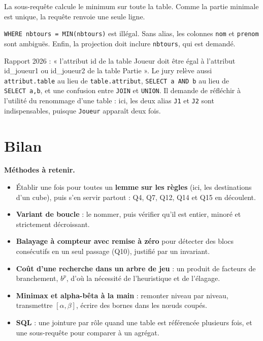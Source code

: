 \documentclass[11pt,a4paper]{article}
\providecommand{\tightlist}{\setlength{\itemsep}{0pt}\setlength{\parskip}{0pt}}
\begin{document}
La sous-requête calcule le minimum sur toute la table. Comme la partie minimale est unique, la requête renvoie une seule ligne.

\begin{piege}

\texttt{WHERE\ nbtours\ =\allowbreak{}\ MIN(\allowbreak{}nbtours)\allowbreak{}} est illégal. Sans alias, les colonnes \texttt{nom} et \texttt{prenom} sont ambiguës. Enfin, la projection doit inclure \texttt{nbtours}, qui est demandé.

\end{piege}

\begin{jury}

Rapport 2026 : « l'attribut id de la table Joueur doit être égal à l'attribut id\_joueur1 ou id\_joueur2 de la table Partie ». Le jury relève aussi \texttt{attribut.table} au lieu de \texttt{table.attribut}, \texttt{SELECT\ a\ AND\ b} au lieu de \texttt{SELECT\ a,b}, et une confusion entre \texttt{JOIN} et \texttt{UNION}. Il demande de réfléchir à l'utilité du renommage d'une table : ici, les deux alias \texttt{J1} et \texttt{J2} sont indispensables, puisque \texttt{Joueur} apparaît deux fois.

\end{jury}

\hypertarget{bilan}{%
\section{Bilan}\label{bilan}}

\textbf{Méthodes à retenir.}

\begin{itemize}
\tightlist
\item
  Établir une fois pour toutes un \textbf{lemme sur les règles} (ici, les destinations d'un cube), puis s'en servir partout : Q4, Q7, Q12, Q14 et Q15 en découlent.
\item
  \textbf{Variant de boucle} : le nommer, puis vérifier qu'il est entier, minoré et strictement décroissant.
\item
  \textbf{Balayage à compteur avec remise à zéro} pour détecter des blocs consécutifs en un seul passage (Q10), justifié par un invariant.
\item
  \textbf{Coût d'une recherche dans un arbre de jeu} : un produit de facteurs de branchement, \(b^p\), d'où la nécessité de l'heuristique et de l'élagage.
\item
  \textbf{Minimax et alpha-bêta à la main} : remonter niveau par niveau, transmettre \([\alpha,\beta]\), écrire des bornes dans les nœuds coupés.
\item
  \textbf{SQL} : une jointure par rôle quand une table est référencée plusieurs fois, et une sous-requête pour comparer à un agrégat.
\end{itemize}
\end{document}
